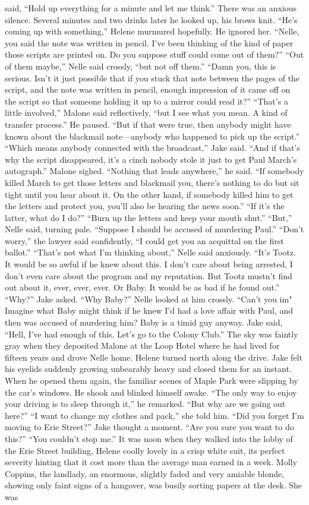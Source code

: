 \documentclass{novel}
\begin{document}
said, “Hold up everything for a minute and let me think.” There was an anxious silence. Several minutes and two drinks later he looked up, his brows knit. “He’s coming up with something,” Helene murmured hopefully. He ignored her. “Nelle, you said the note was written in pencil. I’ve been thinking of the kind of paper those scripts are printed on. Do you suppose stuff could come out of them?” “Out of them maybe,” Nelle said crossly, “but not off them.” “Damn you, this is serious. Isn’t it just possible that if you stuck that note between the pages of the script, and the note was written in pencil, enough impression of it came off on the script so that someone holding it up to a mirror could read it?” “That’s a little involved,” Malone said reflectively, “but I see what you mean. A kind of transfer process.” He paused. “But if that were true, then anybody might have known about the blackmail note—anybody who happened to pick up the script.” “Which means anybody connected with the broadcast,” Jake said. “And if that’s why the script disappeared, it’s a cinch nobody stole it just to get Paul March’s autograph.” Malone sighed. “Nothing that leads anywhere,” he said. “If somebody killed March to get those letters and blackmail you, there’s nothing to do but sit tight until you hear about it. On the other hand, if somebody killed him to get the letters and protect you, you’ll also be hearing the news soon.” “If it’s the latter, what do I do?” “Burn up the letters and keep your mouth shut.” “But,” Nelle said, turning pale. “Suppose I should be accused of murdering Paul.” “Don’t worry,” the lawyer said confidently, “I could get you an acquittal on the first ballot.” “That’s not what I’m thinking about,” Nelle said anxiously. “It’s Tootz. It would be so awful if he knew about this. I don’t care about being arrested, I don’t even care about the program and my reputation. But Tootz mustn’t find out about it, ever, ever, ever. Or Baby. It would be as bad if he found out.” “Why?” Jake asked. “Why Baby?” Nelle looked at him crossly. “Can’t you im" Imagine what Baby might think if he knew I’d had a love affair with Paul, and then was accused of murdering him? Baby is a timid guy anyway. Jake said, “Hell, I've had enough of this. Let’s go to the Colony Club.” The sky was faintly gray when they deposited Malone at the Loop Hotel where he had lived for fifteen years and drove Nelle home. Helene turned north along the drive. Jake felt his eyelids suddenly growing unbearably heavy and closed them for an instant. When he opened them again, the familiar scenes of Maple Park were slipping by the car’s windows. He shook and blinked himself awake. “The only way to enjoy your driving is to sleep through it,” he remarked. “But why are we going out here?” “I want to change my clothes and pack,” she told him. “Did you forget I’m moving to Erie Street?” Jake thought a moment. “Are you sure you want to do this?” “You couldn’t stop me.” It was noon when they walked into the lobby of the Erie Street building, Helene coolly lovely in a crisp white suit, its perfect severity hinting that it cost more than the average man earned in a week. Molly Coppins, the landlady, an enormous, slightly faded and very amiable blonde, showing only faint signs of a hangover, was busily sorting papers at the desk. She was 
\end{document}
